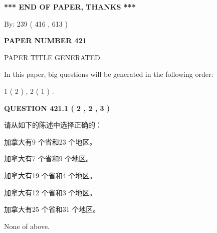 \documentclass{ctexart}
\begin{document}
   
   
   
\vspace{1.0in} 
{\textbf{\large{ *** END OF PAPER, THANKS *** }}} 
   
   
\hspace{1.0in} By: 
 239 ( 416 ,  613 )
   
   
   
   
\newpage 
\setcounter{page}{ 
   421001 } 
   
   
   
   
 {\textbf{ \Large{ PAPER NUMBER  421  }}}
   
   
\vspace{0.2in}
   
   
   
   
   
   
   
   
 \vspace{0.2in}
 
 
 
 
   
   
 PAPER TITLE GENERATED.
   
   
   
\vspace{0.2in}
   
In this paper, big questions will be generated in the following order: 
   
   
   1 ( 2 )
 ,
   2 ( 1 )
 .
  
\vspace{0.2in}
  
{\textbf{\Large{QUESTION
421.1 
 ( 2 , 2 , 3 )
}}}
  
  
请从如下的陈述中选择正确的：
 
 
加拿大有9 个省和23 个地区。
 
 
加拿大有7 个省和9 个地区。
 
 
加拿大有19 个省和4 个地区。
 
 
加拿大有12 个省和3 个地区。
 
 
加拿大有25 个省和31 个地区。
 
 
 None of above.
 
 
\noindent{}
 
\end{document}
